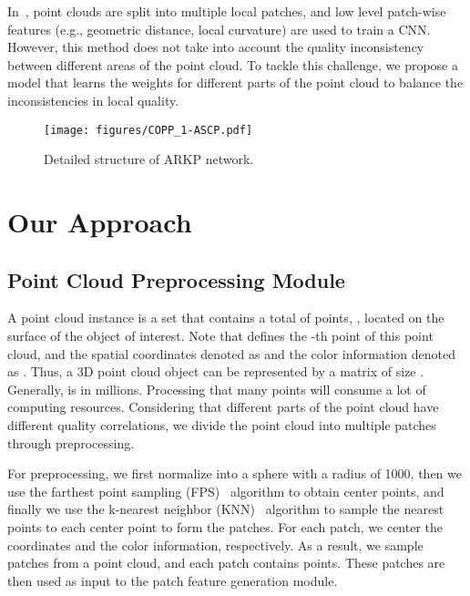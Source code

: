 \documentclass[conference]{IEEEtran}
\begin{document}
In~\cite{chetouani2021deep}, point clouds are split into multiple local patches, and low level patch-wise features (e.g., geometric distance, local curvature) are used to train a CNN. However, this method does not take into account the quality inconsistency between different areas of the point cloud. To tackle this challenge, we propose a model that learns the weights for different parts of the point cloud to balance the inconsistencies in local quality.


\begin{figure}[t]       \begin{center}
    \texttt{[image: figures/COPP\_1-ASCP.pdf]}
\end{center}
\vspace{-0.1cm}
   \caption{Detailed structure of ARKP network.}
\label{fig:ARKP}
\end{figure}






\section{Our Approach}





\subsection{Point Cloud Preprocessing Module}
A point cloud instance is a set  that contains a total of  points, , located on the surface of the object of interest. Note that  defines the -th point of this point cloud, and the spatial coordinates denoted as  and the color information denoted as . Thus, a 3D point cloud object can be represented by a matrix of size . Generally,  is in millions. Processing that many points will consume a lot of computing resources. Considering that different parts of the point cloud have different quality correlations, we divide the point cloud into multiple patches through preprocessing.

For preprocessing, we first normalize  into a sphere with a radius of 1000, then we use the farthest point sampling (FPS)~\cite{qi2017pointnet++} algorithm to obtain  center points, and finally we use the k-nearest neighbor (KNN)~\cite{abeywickrama2016k} algorithm to sample the nearest  points to each center point to form the patches. For each patch, we center the  coordinates and the  color information, respectively. As a result, we sample  patches from a point cloud, and each patch contains  points. These patches are then used as input to the patch feature generation module.
\end{document}
